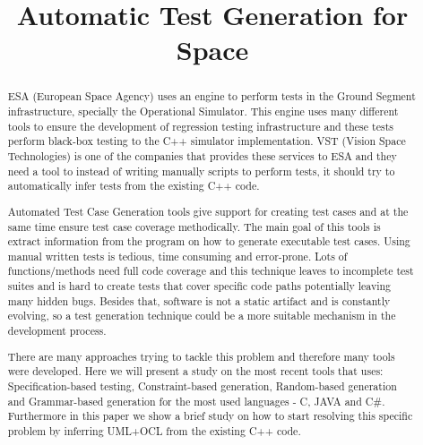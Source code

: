 \documentclass[10pt, conference, compsocconf]{IEEEtran}
\begin{document}
\title{Automatic Test Generation for Space}

\author{
\and
{}
\and
{}
}

\maketitle

\begin{abstract}
ESA (European Space Agency) uses an engine to perform tests in the Ground Segment infrastructure, specially the Operational Simulator.
This engine uses many different tools to ensure the development of regression testing infrastructure and
these tests perform black-box testing to the C++ simulator implementation.
VST (Vision Space Technologies) is one of the companies that provides these services to ESA and they need a tool to
instead of writing manually scripts to perform tests, it should try to automatically infer tests from the existing C++ code.

Automated Test Case Generation tools give support for creating test cases and at the same time ensure test case coverage methodically.
The main goal of this tools is extract information from the program on how to generate executable test cases.
Using manual written tests is tedious, time consuming and error-prone.
Lots of functions/methods need full code coverage and this technique leaves to incomplete test suites and is hard to
create tests that cover specific code paths potentially leaving many hidden bugs.
Besides that, software is not a static artifact and is constantly evolving, so a test generation technique could be a more suitable mechanism in the development process.

There are many approaches trying to tackle this problem and therefore many tools were developed. Here we will present a study on the most
recent tools that uses: Specification-based testing, Constraint-based generation, Random-based generation and Grammar-based generation
for the most used languages - C, JAVA and C\#.
Furthermore in this paper we show a brief study on how to start resolving this specific problem by inferring UML+OCL from the existing C++ code.
\end{abstract}
\end{document}
